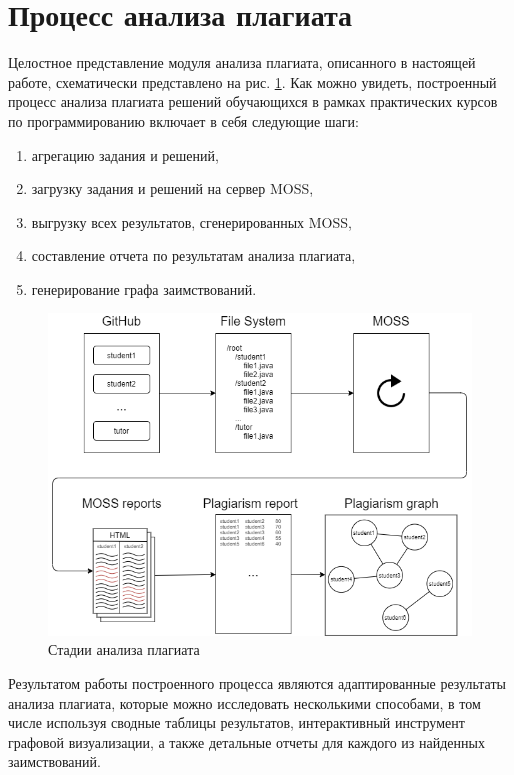 \documentclass[a4paper,14pt]{extarticle}
\begin{document}
\section{Процесс анализа плагиата}

Целостное представление модуля анализа плагиата, описанного в настоящей работе, схематически представлено на рис. \ref{fig:pipeline}. Как можно увидеть, построенный процесс анализа плагиата решений обучающихся в рамках практических курсов по программированию включает в себя следующие шаги:

\begin{enumerate}
    \item агрегацию задания и решений,
    \item загрузку задания и решений на сервер MOSS,
    \item выгрузку всех результатов, сгенерированных MOSS,
    \item составление отчета по результатам анализа плагиата,
    \item генерирование графа заимствований.
\end{enumerate}

\begin{figure}[h!]
\centering
\includegraphics[width=1.0\textwidth]{graph2viz.png}
\caption{Стадии анализа плагиата}
\label{fig:pipeline}
\end{figure}

Результатом работы построенного процесса являются адаптированные результаты анализа плагиата, которые можно исследовать несколькими способами, в том числе используя сводные таблицы результатов, интерактивный инструмент графовой визуализации, а также детальные отчеты для каждого из найденных заимствований.
\end{document}
